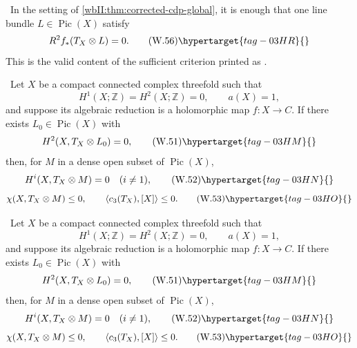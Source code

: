 
\begin{corollary}\hypertarget{tag-03DT}{}\label{wbII:cor:corrected-cdp-relative}

\label{wbII:cor:relative}
\ In the setting of
\cref{wbII:thm:corrected-cdp-global}, it is enough that one line bundle
\(L\in\operatorname{Pic}(X)\) satisfy
\[
 R^2f_*(T_X\otimes L)=0.
\tag{W.56}\hypertarget{tag-03HR}{}\label{wbII:eq:W:5.29}
\]
This is the valid content of the sufficient criterion printed as
\cite[Proposition~2.4, p.~680]{CDP20}.
\end{corollary}

\begin{theorem}
\hypertarget{tag-03J0}{}\label{wbII:thm:corrected-cdp-global}

\label{wbII:thm:corrected-global}
\ Let \(X\) be a compact connected complex threefold such that
\[
 H^1(X;\mathbb Z)=H^2(X;\mathbb Z)=0,\qquad a(X)=1,
\]
and suppose its algebraic reduction is a holomorphic map
\(f:X\to C\).  If there exists \(L_0\in\operatorname{Pic}(X)\) with
\[
 H^2(X,T_X\otimes L_0)=0,
\tag{W.51}\hypertarget{tag-03HM}{}\label{wbII:eq:W:5.24}
\]
then, for \(M\) in a dense open subset of \(\operatorname{Pic}(X)\),
\[
 H^i(X,T_X\otimes M)=0\quad(i\ne1),
\tag{W.52}\hypertarget{tag-03HN}{}\label{wbII:eq:W:5.25}
\]
\[
 \chi(X,T_X\otimes M)\le0,\qquad
 \left\langle c_3(T_X),[X]\right\rangle\le0.
\tag{W.53}\hypertarget{tag-03HO}{}\label{wbII:eq:W:5.26}
\]
\end{theorem}

\begin{theorem}
\hypertarget{tag-03J0}{}\label{wbII:thm:corrected-cdp-global}

\label{wbII:thm:corrected-global}
\ Let \(X\) be a compact connected complex threefold such that
\[
 H^1(X;\mathbb Z)=H^2(X;\mathbb Z)=0,\qquad a(X)=1,
\]
and suppose its algebraic reduction is a holomorphic map
\(f:X\to C\).  If there exists \(L_0\in\operatorname{Pic}(X)\) with
\[
 H^2(X,T_X\otimes L_0)=0,
\tag{W.51}\hypertarget{tag-03HM}{}\label{wbII:eq:W:5.24}
\]
then, for \(M\) in a dense open subset of \(\operatorname{Pic}(X)\),
\[
 H^i(X,T_X\otimes M)=0\quad(i\ne1),
\tag{W.52}\hypertarget{tag-03HN}{}\label{wbII:eq:W:5.25}
\]
\[
 \chi(X,T_X\otimes M)\le0,\qquad
 \left\langle c_3(T_X),[X]\right\rangle\le0.
\tag{W.53}\hypertarget{tag-03HO}{}\label{wbII:eq:W:5.26}
\]
\end{theorem}

